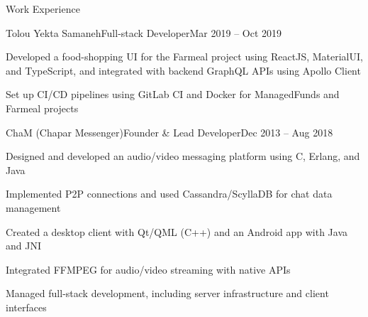 \documentclass[]{main}
\begin{document}
\begin{section}{Work Experience}
\begin{subsection}{Tolou Yekta Samaneh}{Full-stack Developer}{Mar 2019 -- Oct 2019}{}
     \item Developed a food-shopping UI for the Farmeal project using ReactJS, MaterialUI, and TypeScript, and integrated with backend GraphQL APIs using Apollo Client
     \item Set up CI/CD pipelines using GitLab CI and Docker for ManagedFunds and Farmeal projects
 \end{subsection}
 \begin{subsection}{ChaM (Chapar Messenger)}{Founder \& Lead Developer}{Dec 2013 -- Aug 2018}{}
     \item Designed and developed an audio/video messaging platform using C, Erlang, and Java
     \item Implemented P2P connections and used Cassandra/ScyllaDB for chat data management
     \item Created a desktop client with Qt/QML (C++) and an Android app with Java and JNI
     \item Integrated FFMPEG for audio/video streaming with native APIs
     \item Managed full-stack development, including server infrastructure and client interfaces
 \end{subsection}
\end{section}

\end{document}

